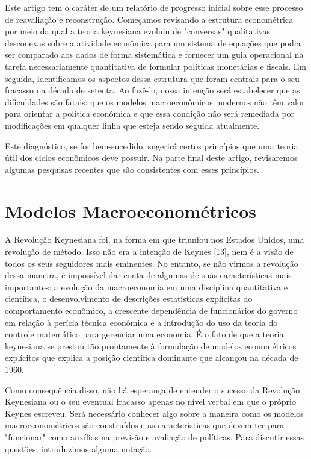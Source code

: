 \documentclass[12pt]{article}
\begin{document}
Este artigo tem o caráter de um relatório de progresso inicial sobre esse processo de reavaliação e reconstrução. Começamos revisando a estrutura econométrica por meio da qual a teoria keynesiana evoluiu de "conversas" qualitativas desconexas sobre a atividade econômica para um sistema de equações que podia ser comparado aos dados de forma sistemática e fornecer um guia operacional na tarefa necessariamente quantitativa de formular políticas monetárias e fiscais. Em seguida, identificamos os aspectos dessa estrutura que foram centrais para o seu fracasso na década de setenta. Ao fazê-lo, nossa intenção será estabelecer que as dificuldades são fatais: que os modelos macroeconômicos modernos não têm valor para orientar a política econômica e que essa condição não será remediada por modificações em qualquer linha que esteja sendo seguida atualmente.

Este diagnóstico, se for bem-sucedido, sugerirá certos princípios que uma teoria útil dos ciclos econômicos deve possuir. Na parte final deste artigo, revisaremos algumas pesquisas recentes que são consistentes com esses princípios.

\section{Modelos Macroeconométricos}

A Revolução Keynesiana foi, na forma em que triunfou nos Estados Unidos, uma revolução de método. Isso não era a intenção de Keynes [13], nem é a visão de todos os seus seguidores mais eminentes. No entanto, se não virmos a revolução dessa maneira, é impossível dar conta de algumas de suas características mais importantes: a evolução da macroeconomia em uma disciplina quantitativa e científica, o desenvolvimento de descrições estatísticas explícitas do comportamento econômico, a crescente dependência de funcionários do governo em relação à perícia técnica econômica e a introdução do uso da teoria do controle matemático para gerenciar uma economia. É o fato de que a teoria keynesiana se prestou tão prontamente à formulação de modelos econométricos explícitos que explica a posição científica dominante que alcançou na década de 1960.

Como consequência disso, não há esperança de entender o sucesso da Revolução Keynesiana ou o seu eventual fracasso apenas no nível verbal em que o próprio Keynes escreveu. Será necessário conhecer algo sobre a maneira como os modelos macroeconométricos são construídos e as características que devem ter para "funcionar" como auxílios na previsão e avaliação de políticas. Para discutir essas questões, introduzimos alguma notação.
\end{document}
